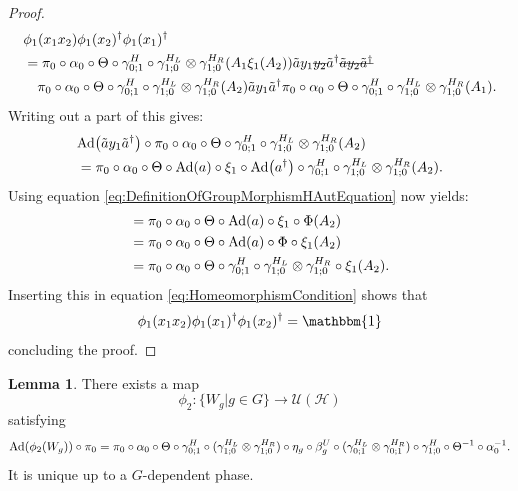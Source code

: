 \documentclass[12pt,a4paper,twoside]{article}
\newcommand{\stkout}[1]{\ifmmode\text{\sout{\ensuremath{#1}}}\else\sout{#1}\fi}
\let\originalleft\left
\let\originalright\right
\renewcommand{\left}{\mathopen{}\mathclose\bgroup\originalleft}
\renewcommand{\right}{\aftergroup\egroup\originalright}
\newcommand{\UU}{\mathcal U}
\newcommand{\HH}{\mathcal H}
\newcommand{\id}{\mathbbm{1}}
\newcommand{\Ad}[1]{\textrm{Ad}\left(#1\right)}
\theoremstyle{definition}
\newtheorem{lemma}[theorem]{Lemma}
\numberwithin{equation}{section}
\begin{document}
\begin{proof}
\begin{align}
		&\phi_1(x_1x_2)\phi_1(x_2)^\dagger\phi_1(x_1)^\dagger\\
		\label{eq:HomeomorphismCondition}
		&=\pi_0\circ\alpha_0\circ\Theta\circ\gamma^H_{0;1}\circ\gamma^{H_L}_{1;0}\otimes\gamma^{H_R}_{1;0}(A_1\xi_1(A_2))\tilde{a}y_1\stkout{y_2}\tilde{a}^\dagger \stkout{\tilde{a}y_2\tilde{a}^\dagger}\\
		\nonumber
		&\quad\pi_0\circ\alpha_0\circ\Theta\circ\gamma^H_{0;1}\circ\gamma^{H_L}_{1;0}\otimes\gamma^{H_R}_{1;0}(A_2)\tilde{a}y_1\tilde{a}^\dagger \pi_0\circ\alpha_0\circ\Theta\circ\gamma^H_{0;1}\circ\gamma^{H_L}_{1;0}\otimes\gamma^{H_R}_{1;0}(A_1).
	\end{align}
	Writing out a part of this gives:
	\begin{align}
		&\Ad{\tilde{a}y_1\tilde{a}^\dagger}\circ\pi_0\circ\alpha_0\circ\Theta\circ\gamma^H_{0;1}\circ\gamma^{H_L}_{1;0}\otimes\gamma^{H_R}_{1;0}(A_2)\\
		&=\pi_0\circ\alpha_0\circ\Theta\circ\Ad{a}\circ\xi_1\circ\Ad{a^\dagger}\circ\gamma^H_{0;1}\circ\gamma^{H_L}_{1;0}\otimes\gamma^{H_R}_{1;0}(A_2).
	\end{align}
	Using equation \eqref{eq:DefinitionOfGroupMorphismHAutEquation} now yields:
	\begin{align}
		&=\pi_0\circ\alpha_0\circ\Theta\circ\Ad{a}\circ\xi_1\circ\Phi(A_2)\\
		&=\pi_0\circ\alpha_0\circ\Theta\circ\Ad{a}\circ\Phi\circ\xi_1(A_2)\\
		&=\pi_0\circ\alpha_0\circ\Theta\circ\gamma^H_{0;1}\circ\gamma^{H_L}_{1;0}\otimes\gamma^{H_R}_{1;0}\circ\xi_1(A_2).
	\end{align}
	Inserting this in equation \eqref{eq:HomeomorphismCondition} shows that
	\begin{equation}
		\phi_1(x_1x_2)\phi_1(x_1)^\dagger\phi_1(x_2)^\dagger=\id
	\end{equation}
	concluding the proof.
\end{proof}
\begin{lemma}\label{lem:DefinitionOfWgMap}
	There exists a map
	\begin{equation}
		\phi_2:\{W_g|g\in G\}\rightarrow \UU(\HH)
	\end{equation}
	satisfying
	\begin{equation}\label{eq:lemDefinitionOfWgMapCondition}
		\Ad{\phi_2(W_g)}\circ\pi_0=\pi_0\circ \alpha_0\circ\Theta\circ\gamma^{H}_{0;1}\circ(\gamma^{H_L}_{1;0}\otimes\gamma^{H_R}_{1;0})\circ\eta_g\circ\beta_g^U\circ(\gamma^{H_L}_{0;1}\otimes\gamma^{H_R}_{0;1})\circ\gamma^{H}_{1;0}\circ\Theta^{-1}\circ\alpha_0^{-1}.
	\end{equation}
	It is unique up to a $G$-dependent phase.
\end{lemma}
\end{document}
